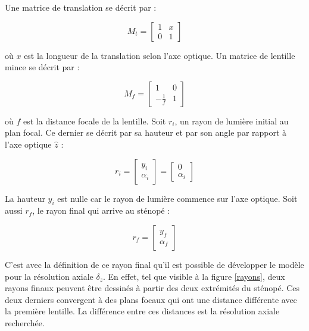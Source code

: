 \documentclass[11pt,letterpaper]{article}
\begin{document}
Une matrice de translation se décrit par :

\begin{equation}
  M_{t}= 
  \begin{bmatrix}
    1 & x \\
    0 & 1
  \end{bmatrix}
\end{equation}

où $x$ est la longueur de la translation selon l'axe optique. Un matrice de lentille mince se décrit par :

\begin{equation}
  M_{f} = 
  \begin{bmatrix}
    1 & 0 \\
    -\frac{1}{f} & 1
  \end{bmatrix}
\end{equation}

où $f$ est la distance focale de la lentille. Soit $r_i$, un rayon de lumière initial au plan focal. Ce dernier se décrit par sa hauteur et par son angle par rapport à l'axe optique $\hat{z}$ :

\begin{equation}
  r_{i}= 
  \begin{bmatrix}
    y_{i} \\
    \alpha_{i}
  \end{bmatrix}= 
  \begin{bmatrix}
    0 \\
    \alpha_{i}
  \end{bmatrix}
\end{equation}

La hauteur $y_{i}$ est nulle car le rayon de lumière commence sur l'axe optique. Soit aussi $r_{f}$, le rayon final qui arrive au sténopé :

\begin{equation}
  r_{f}= 
  \begin{bmatrix}
    y_{f} \\
    \alpha_{f}
  \end{bmatrix}
\end{equation}

C'est avec la définition de ce rayon final qu'il est possible de développer le modèle pour la résolution axiale $\delta_{z}$. En effet, tel que visible à la figure \ref{rayons}, deux rayons finaux peuvent être dessinés à partir des deux extrémités du sténopé. Ces deux derniers convergent à des plans focaux qui ont une distance différente avec la première lentille. La différence entre ces distances est la résolution axiale recherchée.
\end{document}
